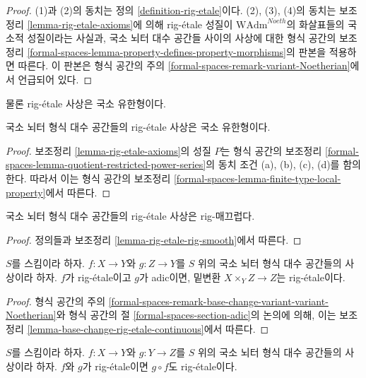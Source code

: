 \begin{proof}
(1)과 (2)의 동치는 정의 \ref{definition-rig-etale}이다.
(2), (3), (4)의 동치는 보조정리 \ref{lemma-rig-etale-axioms}에 의해
rig-\'etale 성질이 $\text{WAdm}^{Noeth}$의 화살표들의 국소적 성질이라는 사실과,
국소 뇌터 대수 공간들 사이의 사상에 대한 형식 공간의 보조정리
\ref{formal-spaces-lemma-property-defines-property-morphisms}의 판본을
적용하면 따른다. 이 판본은 형식 공간의 주의
\ref{formal-spaces-remark-variant-Noetherian}에서 언급되어 있다.
\end{proof}

\noindent
물론 rig-\'etale 사상은 국소 유한형이다.

\begin{lemma}
\label{lemma-rig-etale-finite-type}
국소 뇌터 형식 대수 공간들의 rig-\'etale 사상은 국소 유한형이다.
\end{lemma}

\begin{proof}
보조정리 \ref{lemma-rig-etale-axioms}의 성질 $P$는
형식 공간의 보조정리
\ref{formal-spaces-lemma-quotient-restricted-power-series}의
동치 조건 (a), (b), (c), (d)를 함의한다. 따라서 이는 형식 공간의 보조정리
\ref{formal-spaces-lemma-finite-type-local-property}에서 따른다.
\end{proof}

\begin{lemma}
\label{lemma-rig-etale-rig-smooth-morphism}
국소 뇌터 형식 대수 공간들의 rig-\'etale 사상은 rig-매끄럽다.
\end{lemma}

\begin{proof}
정의들과 보조정리 \ref{lemma-rig-etale-rig-smooth}에서 따른다.
\end{proof}

\begin{lemma}
\label{lemma-base-change-rig-etale}
$S$를 스킴이라 하자. $f : X \to Y$와 $g : Z \to Y$를
$S$ 위의 국소 뇌터 형식 대수 공간들의 사상이라 하자.
$f$가 rig-\'etale이고 $g$가 adic이면, 밑변환
$X \times_Y Z \to Z$는 rig-\'etale이다.
\end{lemma}

\begin{proof}
형식 공간의 주의
\ref{formal-spaces-remark-base-change-variant-variant-Noetherian}와
형식 공간의 절 \ref{formal-spaces-section-adic}의 논의에 의해,
이는 보조정리 \ref{lemma-base-change-rig-etale-continuous}에서 따른다.
\end{proof}

\begin{lemma}
\label{lemma-composition-rig-etale}
$S$를 스킴이라 하자. $f : X \to Y$와 $g : Y \to Z$를
$S$ 위의 국소 뇌터 형식 대수 공간들의 사상이라 하자.
$f$와 $g$가 rig-\'etale이면 $g \circ f$도 rig-\'etale이다.
\end{lemma}

